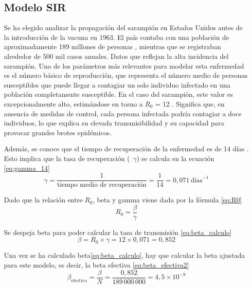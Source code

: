 \subsection{Modelo SIR}
Se ha elegido analizar la propagación del sarampión en Estados Unidos antes de la introducción de la vacuna en 1963. El país contaba con una población de aproximadamente 189 millones de personas \cite{datosmacro_usa_1963}, mientras que se registraban alrededor de 500 mil casos anuales. Datos que reflejan la alta incidencia del sarampión.
Uno de los parámetros más relevantes para modelar esta enfermedad es el número básico de reproducción, que representa el número medio de personas susceptibles que puede llegar a contagiar un solo individuo infectado en una población completamente susceptible. En el caso del sarampión, este valor es excepcionalmente alto, estimándose en torno a $R_0$ = 12 \cite{solomon2019peter}. Significa que, en ausencia de medidas de control, cada persona infectada podría contagiar a doce individuos, lo que explica su elevada transmisibilidad y su capacidad para provocar grandes brotes epidémicos.

Además, se conoce que el tiempo de recuperación de la enfermedad es de 14 días \cite{ops_sarampion}. Esto implica que la tasa de recuperación (~$\gamma$) se calcula en la ecuación \eqref{eq:gamma_14}
\begin{equation}
\gamma = \frac{1}{\text{tiempo medio de recuperación}} = \frac{1}{14} = 0{,}071 \,\text{días}^{-1}
\label{eq:gamma_14}
\end{equation}

Dado que la relación entre $R_0$, beta y gamma viene dada por la fórmula \eqref{eq:R0}
\begin{equation}
R_0 = \frac{\beta}{\gamma}
\label{eq:R0}
\end{equation}

Se despeja beta para poder calcular la tasa de transmisión \eqref{eq:beta_calculo}
\begin{equation}
\beta = R_0 \times \gamma = 12 \times 0{,}071 = 0{,}852
\label{eq:beta_calculo}
\end{equation}

Una vez se ha calculado beta\eqref{eq:beta_calculo}, hay que calcular la beta ajustada para este modelo, es decir, la beta efectiva \eqref{eq:beta_efectiva2}
\begin{equation}
\beta_{\text{efectiva}} = \frac{\beta}{N} = \frac{0{,}852}{189\,000\,000} = 4{,}5 \times 10^{-9}
\label{eq:beta_efectiva2}
\end{equation}

